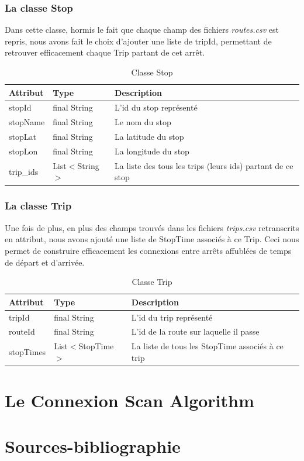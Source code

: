 \documentclass[12pt,openany]{article}
\begin{document}
\subsubsection{La classe Stop}
Dans cette classe, hormis le fait que chaque champ des fichiers \emph{routes.csv} est repris, nous avons fait le choix d'ajouter
une liste de tripId, permettant de retrouver efficacement chaque Trip partant de cet arrêt. 

\begin{table}[h]
    \centering
    \begin{tabular}{|l|l|p{8cm}|}
    \hline
    \textbf{Attribut} & \textbf{Type} & \textbf{Description} \\
    \hline
    stopId & final String & L'id du stop représenté \\
    stopName & final String & Le nom du stop \\
    stopLat & final String & La latitude du stop \\
    stopLon & final String & La longitude du stop \\
    trip\_ids & List$<$String$>$ & La liste des tous les trips (leurs ids) partant de ce stop \\
    \hline
    \end{tabular}
    \caption{Classe Stop}
\end{table}

\subsubsection{La classe Trip}
Une fois de plus, en plus des champs trouvés dans les fichiers \emph{trips.csv} retranscrits en attribut, nous avons ajouté
une liste de StopTime associés à ce Trip. Ceci nous permet de construire efficacement les connexions entre arrêts affublées
de temps de départ et d'arrivée.

\begin{table}[h]
    \centering
    \begin{tabular}{|l|l|p{8cm}|}
    \hline
    \textbf{Attribut} & \textbf{Type} & \textbf{Description} \\
    \hline
    tripId & final String & L'id du trip représenté \\
    routeId & final String & L'id de la route sur laquelle il passe \\
    stopTimes & List$<$StopTime$>$ &  La liste de tous les StopTime associés à ce trip \\
    \hline
    \end{tabular}
    \caption{Classe Trip}
\end{table}

\section{Le Connexion Scan Algorithm}

\section{Sources-bibliographie}
\end{document}
